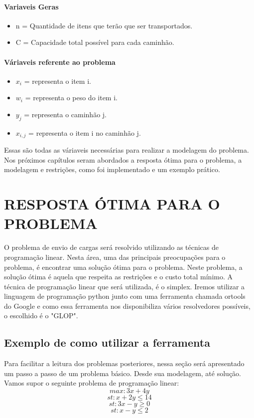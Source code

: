   \paragraph{Variaveis Geras}
    \begin{itemize}
      \item n = Quantidade de itens que terão que ser transportados.
      \item C = Capacidade total possível para cada caminhão.
    \end{itemize}

  \paragraph{Váriaveis referente ao problema}
    \begin{itemize}
      \item {\( x_{i} \) = representa o item i. }
      \item {\( w_{i} \) = representa o peso do item i. }
      \item {\( y_{j} \) = representa o caminhão j.}
      \item \( x_{i,j}\) = representa o item i no caminhão j.
    \end{itemize}

  Essas são todas as váriaveis necessárias para realizar a modelagem do problema. Nos próximos capítulos seram abordados a resposta ótima para o problema, a modelagem e restrições, como foi implementado e um exemplo prático. 

\section{RESPOSTA ÓTIMA PARA O PROBLEMA}
  O problema de envio de cargas será resolvido utilizando as técnicas de programação linear. Nesta área, uma das principais preocupações para o problema, é encontrar uma solução ótima para o problema. Neste problema, a solução ótima é aquela que respeita as restrições e o custo total mínimo. A técnica de programação linear que será utilizada, é o simplex.
  Iremos utilizar a linguagem de programação python junto com uma ferramenta chamada ortools do Google e como essa ferramenta nos disponibiliza vários resolvedores possíveis, o escolhido é o "GLOP".

  \subsection{Exemplo de como utilizar a ferramenta}
    Para facilitar a leitura dos problemas posteriores, nessa seção será apresentado um passo a passo de um problema básico. Desde sua modelagem, até solução. Vamos supor o seguinte problema de programação linear:
    \[max: 3x + 4y \]
    \[st: x + 2y \leq 14 \]
    \[st: 3x - y \geq 0 \]
    \[st: x - y \leq 2 \]

